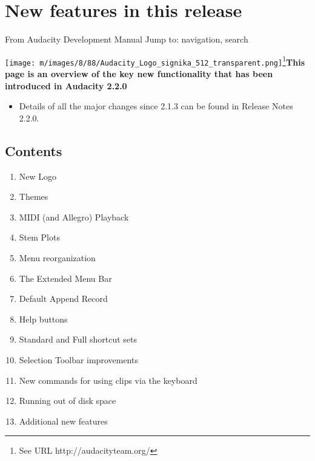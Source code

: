 
																					
\chapter{New features in this release}

\label{f0}													From Audacity Development Manual
															Jump to: navigation, search
					
\texttt{[image: m/images/8/88/Audacity\_Logo\_signika\_512\_transparent.png]}\footnote{See URL http://audacityteam.org/}\newline\textbf{This page is an overview of the key new functionality that has been introduced in Audacity 2.2.0}
\begin{itemize}
\item  Details of all the major changes since 2.1.3 can be found in Release Notes 2.2.0.
\end{itemize}

\section{Contents}

\begin{enumerate}\item New Logo
\item Themes
\item MIDI (and Allegro) Playback
\item Stem Plots
\item Menu reorganization
\item The Extended Menu Bar
\item Default Append Record
\item Help buttons
\item Standard and Full shortcut sets
\item Selection Toolbar improvements
\item New commands for using clips via the keyboard
\item Running out of disk space
\item Additional new features
\end{enumerate}



